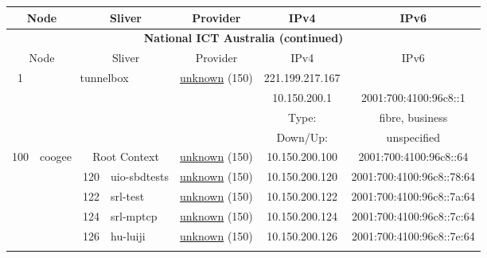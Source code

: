 \begin{small}
\begin{center}
\begin{longtable}{|c|c|c|c|c|c|c|c|}
 \multicolumn{2}{|p{8em}|}{Node} & \multicolumn{2}{|p{8em}|}{Sliver} & \multicolumn{2}{|p{8em}|}{Provider} & IPv4 & IPv6 \\ \hline
\endfirsthead
\hline
 \multicolumn{8}{|c|}{\textbf{National ICT Australia (continued)}} \\ \hline
 \multicolumn{2}{|p{8em}|}{Node} & \multicolumn{2}{|p{8em}|}{Sliver} & \multicolumn{2}{|p{8em}|}{Provider} & IPv4 & IPv6 \\ \hline
\endhead
 \multirow{4}{*}{\tiny{1}} & \multicolumn{3}{|c|}{\multirow{4}{*}{\tiny{tunnelbox}}} & \multicolumn{2}{|c|}{\multirow{4}{*}{\tiny{\href{}{unknown} (150)}}} & \tiny{221.199.217.167} & \frownie{} \\* \cline{7-7}\cline{8-8}
  & \multicolumn{3}{|c|}{} & \multicolumn{2}{|c|}{} & \tiny{10.150.200.1} & \tiny{2001:700:4100:96c8::1} \\* \cline{7-7}\cline{8-8}
  & \multicolumn{3}{|c|}{} & \multicolumn{2}{|c|}{} & Type: & fibre, business \\* \cline{7-7}\cline{8-8}
  & \multicolumn{3}{|c|}{} & \multicolumn{2}{|c|}{} & Down/Up:  & unspecified \\ \hline
 \multirow{8}{*}{\tiny{100}} & \multicolumn{1}{|l|}{\multirow{8}{*}{\tiny{coogee}}} & \multicolumn{2}{|c|}{\tiny{Root Context}} & \multicolumn{2}{|c|}{\tiny{\href{}{unknown} (150)}} & \tiny{10.150.200.100} & \tiny{2001:700:4100:96c8::64} \\* \cline{3-3}\cline{4-4}\cline{5-5}\cline{6-6}\cline{7-7}\cline{8-8}
  &  & \tiny{120} & \multicolumn{1}{|l|}{\tiny{uio-sbdtests}} & \multicolumn{2}{|c|}{\tiny{\href{}{unknown} (150)}} & \tiny{10.150.200.120} & \tiny{2001:700:4100:96c8::78:64} \\* \cline{3-3}\cline{4-4}\cline{5-5}\cline{6-6}\cline{7-7}\cline{8-8}
  &  & \tiny{122} & \multicolumn{1}{|l|}{\tiny{srl-test}} & \multicolumn{2}{|c|}{\tiny{\href{}{unknown} (150)}} & \tiny{10.150.200.122} & \tiny{2001:700:4100:96c8::7a:64} \\* \cline{3-3}\cline{4-4}\cline{5-5}\cline{6-6}\cline{7-7}\cline{8-8}
  &  & \tiny{124} & \multicolumn{1}{|l|}{\tiny{srl-mptcp}} & \multicolumn{2}{|c|}{\tiny{\href{}{unknown} (150)}} & \tiny{10.150.200.124} & \tiny{2001:700:4100:96c8::7c:64} \\* \cline{3-3}\cline{4-4}\cline{5-5}\cline{6-6}\cline{7-7}\cline{8-8}
  &  & \tiny{126} & \multicolumn{1}{|l|}{\tiny{hu-luiji}} & \multicolumn{2}{|c|}{\tiny{\href{}{unknown} (150)}} & \tiny{10.150.200.126} & \tiny{2001:700:4100:96c8::7e:64} \\* \cline{3-3}\cline{4-4}\cline{5-5}\cline{6-6}\cline{7-7}\cline{8-8}

\end{longtable}
\end{center}
\end{small}

